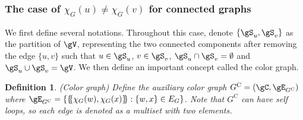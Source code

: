 \documentclass{article} %
\newtheorem{definition}[theorem]{Definition}
\newcommand*{\ldblbrace}{\{\mskip-5mu\{}
\newcommand*{\rdblbrace}{\}\mskip-5mu\}}
\begin{document}
\subsubsection{The case of \texorpdfstring{$\chi_G(u)\neq \chi_G(v)$}{χG(u)=χG(v)} for connected graphs}
\label{sec:proof_spdwl_case1}
We first define several notations. Throughout this case, denote $\{\gS_u,\gS_v\}$ as the partition of $\gV$, representing the two connected components after removing the edge $\{u,v\}$ such that $u\in \gS_u$, $v\in \gS_v$, $\gS_u\cap\gS_v=\emptyset$ and $\gS_u\cup\gS_v=\gV$. We then define an important concept called the color graph.

\begin{definition}
\label{def:color_graph}
\normalfont (Color graph) Define the auxiliary color graph $G^\mathrm{C}=(\gC,\gE_{G^\mathrm{C}})$ where $\gE_{G^\mathrm{C}}=\{\ldblbrace \chi_G(w),\chi_G(x)\rdblbrace:\{w,x\}\in E_G\}$. Note that $G^\mathrm{C}$ can have self loops, so each edge is denoted as a multiset with two elements.
\end{definition}
\end{document}

